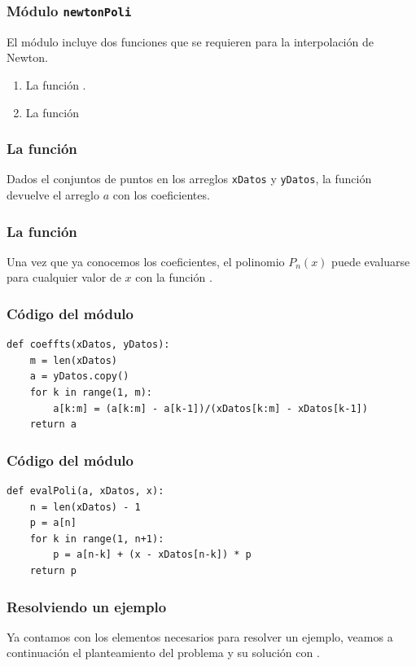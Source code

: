 \documentclass[12pt]{beamer}
\begin{document}
\begin{frame}
\frametitle{Módulo \texttt{newtonPoli}}
El módulo  incluye dos funciones que se requieren para la interpolación de Newton.
\begin{enumerate}[<+->]
\item La función .
\item La función 
\end{enumerate}
\end{frame}
\begin{frame}
\frametitle{La función }
Dados el conjuntos de puntos en los arreglos \texttt{xDatos} y \texttt{yDatos}, la función  devuelve el arreglo $a$ con los coeficientes.
\end{frame}
\begin{frame}
\frametitle{La función }
Una vez que ya conocemos los coeficientes, el polinomio $P_{n}(x)$ puede evaluarse para cualquier valor de $x$ con la función .
\end{frame}
\begin{frame}[fragile]
\frametitle{Código del módulo}
\begin{lstlisting}[caption=Funciones \texttt{coeffts} del módulo \texttt{newtonPoli}, style=FormattedNumber, basicstyle=\linespread{0.9}\ttfamily=\small, columns=fullflexible]    
def coeffts(xDatos, yDatos):
    m = len(xDatos) 
    a = yDatos.copy()
    for k in range(1, m):
        a[k:m] = (a[k:m] - a[k-1])/(xDatos[k:m] - xDatos[k-1])
    return a
\end{lstlisting}
\end{frame}
\begin{frame}[fragile]
\frametitle{Código del módulo}
\begin{lstlisting}[caption=Funciones \texttt{evalPoli} del módulo \texttt{newtonPoli}, style=FormattedNumber, basicstyle=\linespread{0.9}\ttfamily=\small, columns=fullflexible]
def evalPoli(a, xDatos, x):
    n = len(xDatos) - 1 
    p = a[n]
    for k in range(1, n+1):
        p = a[n-k] + (x - xDatos[n-k]) * p
    return p
\end{lstlisting}
\end{frame}
\begin{frame}
\frametitle{Resolviendo un ejemplo}
Ya contamos con los elementos necesarios para resolver un ejemplo, veamos a continuación el planteamiento del problema y su solución con \python.
\end{frame}
\end{document}

